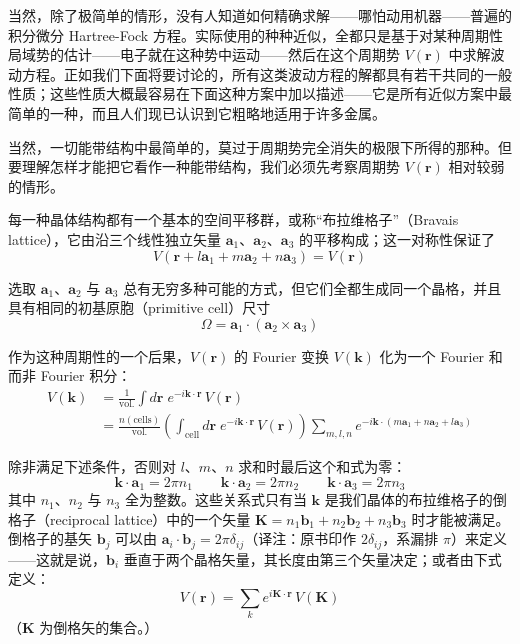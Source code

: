 当然，除了极简单的情形，没有人知道如何精确求解——哪怕动用机器——普遍的积分微分 Hartree-Fock 方程。实际使用的种种近似，全都只是基于对某种周期性局域势的估计——电子就在这种势中运动——然后在这个周期势 $V(\mathbf{r})$ 中求解波动方程。正如我们下面将要讨论的，所有这类波动方程的解都具有若干共同的一般性质；这些性质大概最容易在下面这种方案中加以描述——它是所有近似方案中最简单的一种，而且人们现已认识到它粗略地适用于许多金属。

当然，一切能带结构中最简单的，莫过于周期势完全消失的极限下所得的那种。但要理解怎样才能把它看作一种能带结构，我们必须先考察周期势 $V(\mathbf{r})$ 相对较弱的情形。

每一种晶体结构都有一个基本的空间平移群，或称“布拉维格子”（Bravais lattice），它由沿三个线性独立矢量 $\mathbf{a}_1$、$\mathbf{a}_2$、$\mathbf{a}_3$ 的平移构成；这一对称性保证了
\begin{equation*}
V(\mathbf{r} + l\mathbf{a}_1 + m\mathbf{a}_2 + n\mathbf{a}_3) = V(\mathbf{r})
\end{equation*}

选取 $\mathbf{a}_1$、$\mathbf{a}_2$ 与 $\mathbf{a}_3$ 总有无穷多种可能的方式，但它们全都生成同一个晶格，并且具有相同的初基原胞（primitive cell）尺寸
\begin{equation*}
\Omega = \mathbf{a}_1 \cdot (\mathbf{a}_2 \times \mathbf{a}_3)
\end{equation*}

作为这种周期性的一个后果，$V(\mathbf{r})$ 的 Fourier 变换 $V(\mathbf{k})$ 化为一个 Fourier 和而非 Fourier 积分：
\begin{align*}
V(\mathbf{k}) &= \frac{1}{\text{vol.}} \int d\mathbf{r}\; e^{-i\mathbf{k}\cdot\mathbf{r}}\,V(\mathbf{r}) \\
&= \frac{n(\text{cells})}{\text{vol.}} \left( \int_{\text{cell}} d\mathbf{r}\; e^{-i\mathbf{k}\cdot\mathbf{r}}\,V(\mathbf{r}) \right) \sum_{m,l,n} e^{-i\mathbf{k}\cdot(m\mathbf{a}_1 + n\mathbf{a}_2 + l\mathbf{a}_3)}
\end{align*}

除非满足下述条件，否则对 $l$、$m$、$n$ 求和时最后这个和式为零：
\begin{equation*}
\mathbf{k}\cdot\mathbf{a}_1 = 2\pi n_1 \qquad \mathbf{k}\cdot\mathbf{a}_2 = 2\pi n_2 \qquad \mathbf{k}\cdot\mathbf{a}_3 = 2\pi n_3
\end{equation*}
其中 $n_1$、$n_2$ 与 $n_3$ 全为整数。这些关系式只有当 $\mathbf{k}$ 是我们晶体的布拉维格子的倒格子（reciprocal lattice）中的一个矢量 $\mathbf{K} = n_1\mathbf{b}_1 + n_2\mathbf{b}_2 + n_3\mathbf{b}_3$ 时才能被满足。倒格子的基矢 $\mathbf{b}_j$ 可以由 $\mathbf{a}_i\cdot\mathbf{b}_j = 2\pi\delta_{ij}$（译注：原书印作 $2\delta_{ij}$，系漏排 $\pi$）来定义——这就是说，$\mathbf{b}_i$ 垂直于两个晶格矢量，其长度由第三个矢量决定；或者由下式定义：
\begin{equation*}
V(\mathbf{r}) = \sum_k e^{i\mathbf{K}\cdot\mathbf{r}}\,V(\mathbf{K}) \tag{10}
\end{equation*}
（$\mathbf{K}$ 为倒格矢的集合。）

